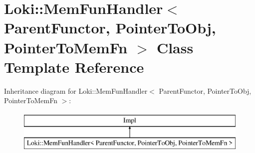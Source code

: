 \hypertarget{classLoki_1_1MemFunHandler}{}\section{Loki\+:\+:Mem\+Fun\+Handler$<$ Parent\+Functor, Pointer\+To\+Obj, Pointer\+To\+Mem\+Fn $>$ Class Template Reference}
\label{classLoki_1_1MemFunHandler}
Inheritance diagram for Loki\+:\+:Mem\+Fun\+Handler$<$ Parent\+Functor, Pointer\+To\+Obj, Pointer\+To\+Mem\+Fn $>$\+:\begin{figure}[H]
\begin{center}
\leavevmode
\includegraphics[height=2.000000cm]{classLoki_1_1MemFunHandler}
\end{center}
\end{figure}
